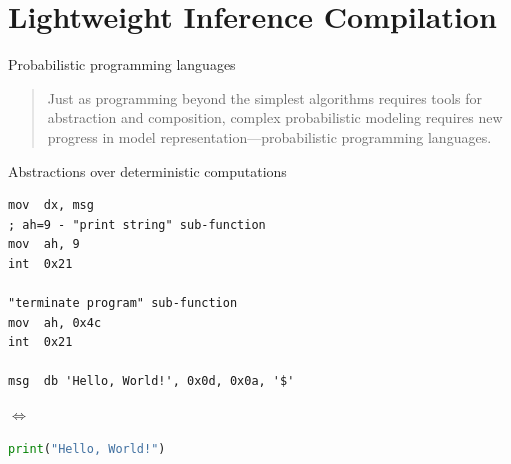\section{Lightweight Inference Compilation}


\begin{subframe}[fragile]{Probabilistic programming languages}

\begin{quote}
    Just as programming beyond the simplest algorithms requires tools for abstraction and composition, complex probabilistic modeling requires new progress in model representation—probabilistic programming languages.
\end{quote}
\parencite{goodman2013principles}
\end{subframe}

\begin{subframe}[fragile]{Abstractions over deterministic computations}
\begin{minipage}{0.4\linewidth}
    \begin{lstlisting}[language={[x86masm]Assembler}] 
mov  dx, msg
; ah=9 - "print string" sub-function
mov  ah, 9
int  0x21

"terminate program" sub-function
mov  ah, 0x4c
int  0x21

msg  db 'Hello, World!', 0x0d, 0x0a, '$'
    \end{lstlisting}
\end{minipage}$\iff$
\begin{minipage}{0.48\linewidth}
    \begin{lstlisting}[language=python]
    print("Hello, World!")
    \end{lstlisting}
\end{minipage}
\end{subframe}

